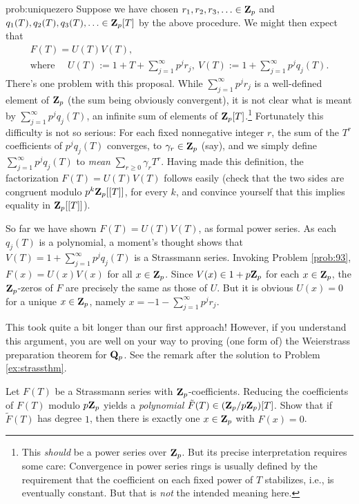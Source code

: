\begin{sol}{prob:uniquezero}
Suppose we have chosen $r_1, r_2, r_3, \ldots \in \mathbf{Z}_p$ and $q_1(T), q_2(T), q_3(T), \ldots \in \mathbf{Z}_p[T]$ by the above procedure. We might then expect that
\begin{multline*} F(T) = U(T)V(T),\\\text{where }\quad U(T):=1+T + \sum_{j=1}^{\infty} p^j r_j,~V(T):=1+\sum_{j=1}^{\infty}p^j q_j(T). \end{multline*}
There's one problem with this proposal. While $\sum_{j=1}^{\infty} p^j r_j$ is a well-defined element of $\mathbf{Z}_p$ (the sum being obviously convergent), it is not clear what is meant by 
$\sum_{j=1}^{\infty}p^j q_j(T)$, an infinite sum of elements of $\mathbf{Z}_p[T]$.\footnote{This \emph{should} be a power series over $\mathbf{Z}_p$. But its precise interpretation requires some care: Convergence in power series rings is usually defined by the requirement that the coefficient on each fixed power of $T$ stabilizes, i.e., is eventually constant. But that is \emph{not} the intended meaning here.} Fortunately this difficulty is not so serious: For each fixed nonnegative integer $r$, the sum of the $T^r$ coefficients of $p^j q_j(T)$ converges, to $\gamma_r \in \mathbf{Z}_p$ (say), and we simply define $\sum_{j=1}^{\infty}p^j q_j(T)$ to \emph{mean} $\sum_{r\ge 0} \gamma_r T^r$. Having made this definition, the factorization $F(T) = U(T) V(T)$ follows easily (check that the two sides are congruent modulo $p^k \mathbf{Z}_p[[T]]$, for every $k$, and convince yourself that this implies equality in $\mathbf{Z}_p[[T]]$).

So far we have shown $F(T) = U(T) V(T)$, as formal power series. As each $q_j(T)$ is a polynomial, a moment's thought shows that $V(T) = 1 + \sum_{j=1}^{\infty} p^j q_j(T)$ is a Strassmann series. Invoking Problem \ref{prob:93}, $F(x) = U(x) V(x)$ for all $x \in \mathbf{Z}_p$. Since $V(x)\in 1+p\mathbf{Z}_p$ for each $x \in \mathbf{Z}_p$, the $\mathbf{Z}_p$-zeros of $F$ are precisely the same as those of $U$. But it is obvious $U(x)=0$ for a unique $x\in \mathbf{Z}_p$, namely $x=-1-\sum_{j=1}^{\infty} p^j r_j$. 

\begin{rmk} This took quite a bit longer than our first approach! However, if you understand this argument, you are well on your way to proving (one form of) the \textsf{Weierstrass preparation theorem for $\mathbf{Q}_p$}. See the remark after the solution to Problem \ref{ex:strassthm}.
\end{rmk}
\end{sol}

\begin{challenge}\label{ex:strasslinear} Let $F(T)$ be a Strassmann series with $\mathbf{Z}_p$-coefficients. Reducing the coefficients of $F(T)$ modulo $p\mathbf{Z}_p$ yields a \emph{polynomial} $\tilde{F}(T) \in (\mathbf{Z}_p/p\mathbf{Z}_p)[T]$. Show that if $\tilde{F}(T)$ has degree $1$, then there is exactly one $x \in \mathbf{Z}_p$ with $F(x)=0$. 
\end{challenge}

